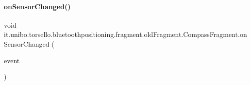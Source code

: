 \hypertarget{classit_1_1unibo_1_1torsello_1_1bluetoothpositioning_1_1fragment_1_1oldFragment_1_1CompassFragment_aadc7f58d3eae6662db5b5ad05a6fd760_aadc7f58d3eae6662db5b5ad05a6fd760}{}\label{classit_1_1unibo_1_1torsello_1_1bluetoothpositioning_1_1fragment_1_1oldFragment_1_1CompassFragment_aadc7f58d3eae6662db5b5ad05a6fd760_aadc7f58d3eae6662db5b5ad05a6fd760} 
\paragraph{\texorpdfstring{on\+Sensor\+Changed()}{onSensorChanged()}}
{\footnotesize\ttfamily void it.\+unibo.\+torsello.\+bluetoothpositioning.\+fragment.\+old\+Fragment.\+Compass\+Fragment.\+on\+Sensor\+Changed (\begin{DoxyParamCaption}\item[{Sensor\+Event}]{event }\end{DoxyParamCaption})}


